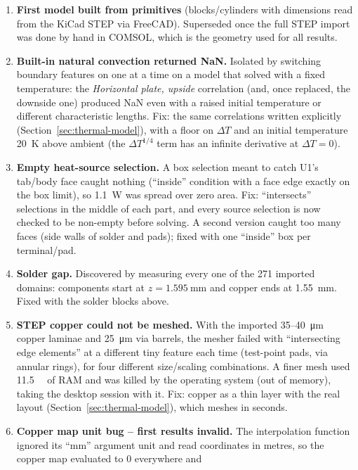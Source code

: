 \documentclass[11pt,letterpaper]{article}
\begin{document}
\begin{enumerate}[nosep]
    \item \textbf{First model built from primitives} (blocks/cylinders with dimensions read from the KiCad
    STEP via FreeCAD). Superseded once the full STEP import was done by hand in COMSOL, which is the
    geometry used for all results.
    \item \textbf{Built-in natural convection returned NaN.} Isolated by switching boundary features on one
    at a time on a model that solved with a fixed temperature: the \textit{Horizontal plate, upside}
    correlation (and, once replaced, the downside one) produced NaN even with a raised initial
    temperature or different characteristic lengths. Fix: the same correlations written explicitly
    (Section~\ref{sec:thermal-model}), with a floor on $\Delta T$ and an initial temperature
    \SI{20}{\kelvin} above ambient (the $\Delta T^{1/4}$ term has an infinite derivative at
    $\Delta T=0$).
    \item \textbf{Empty heat-source selection.} A box selection meant to catch U1's tab/body face caught
    nothing (``inside'' condition with a face edge exactly on the box limit), so \SI{1.1}{\watt} was spread
    over zero area. Fix: ``intersects'' selections in the middle of each part, and every source selection
    is now checked to be non-empty before solving. A second version caught too many faces (side walls of
    solder and pads); fixed with one ``inside'' box per terminal/pad.
    \item \textbf{Solder gap.} Discovered by measuring every one of the 271 imported domains: components
    start at $z=\SI{1.595}{\milli\meter}$ and copper ends at \SI{1.55}{\milli\meter}. Fixed with the
    solder blocks above.
    \item \textbf{STEP copper could not be meshed.} With the imported \SI{35}{}--\SI{40}{\micro\meter}
    copper laminae and \SI{25}{\micro\meter} via barrels, the mesher failed with ``intersecting edge
    elements'' at a different tiny feature each time (test-point pads, via annular rings), for four
    different size/scaling combinations. A finer mesh used \SI{11.5}{\giga\byte} of RAM and was killed by
    the operating system (out of memory), taking the desktop session with it. Fix: copper as a thin
    layer with the real layout (Section~\ref{sec:thermal-model}), which meshes in seconds.
    \item \textbf{Copper map unit bug -- first results invalid.} The interpolation function ignored its
    ``mm'' argument unit and read coordinates in metres, so the copper map evaluated to 0 everywhere and

\end{enumerate}
\end{document}
